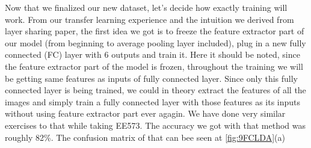 \documentclass[11pt]{article}
\begin{document}
\par Now that we finalized our new dataset, let’s decide how exactly training will work. From our transfer learning experience and the intuition we derived from layer sharing paper, the first idea we got is to freeze the feature extractor part of our model (from beginning to average pooling layer included), plug in a new fully connected (FC) layer with 6 outputs and train it. Here it should be noted, since the feature extractor part of the model is frozen, throughout the training we will be getting same features as inputs of fully connected layer. Since only this fully connected layer is being trained, we could in theory extract the features of all the images and simply train a fully connected layer with those features as its inputs without using feature extractor part ever agagin. We have done very similar exercises to that while taking EE573. The accuracy we got with that method was roughly 82\%. The confusion matrix of that can bee seen at \ref{fig:9FCLDA}{(a)}
\end{document}
